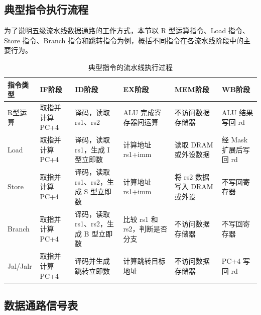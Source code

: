 \documentclass[UTF8,a4paper,12pt]{ctexart}
\begin{document}
\subsection{典型指令执行流程}

为了说明五级流水线数据通路的工作方式，本节以 R 型运算指令、Load 指令、Store 指令、Branch 指令和跳转指令为例，概括不同指令在各流水线阶段中的主要行为。

\begin{table}[H]
\centering
\caption{典型指令的流水线执行过程}
\footnotesize
\setlength{\tabcolsep}{3pt}
\renewcommand{\arraystretch}{1.2}
\begin{tabularx}{\textwidth}{p{2cm}p{2.2cm}p{2.4cm}p{2.4cm}p{2.4cm}X}
\toprule
指令类型 & IF阶段 & ID阶段 & EX阶段 & MEM阶段 & WB阶段 \\
\midrule
R型运算 & 取指并计算 PC+4 & 译码，读取 rs1、rs2 & ALU 完成寄存器间运算 & 不访问数据存储器 & ALU 结果写回 rd \\
Load & 取指并计算 PC+4 & 译码，读取 rs1，生成 I 型立即数 & 计算地址 rs1+imm & 读取 DRAM 或外设数据 & 经 Mask 扩展后写回 rd \\
Store & 取指并计算 PC+4 & 译码，读取 rs1、rs2，生成 S 型立即数 & 计算地址 rs1+imm & 将 rs2 数据写入 DRAM 或外设 & 不写回寄存器 \\
Branch & 取指并计算 PC+4 & 译码，读取 rs1、rs2，生成 B 型立即数 & 比较 rs1 和 rs2，判断是否分支 & 不访问数据存储器 & 不写回寄存器 \\
Jal/Jalr & 取指并计算 PC+4 & 译码并生成跳转立即数 & 计算跳转目标地址 & 不访问数据存储器 & PC+4 写回 rd \\
\bottomrule
\end{tabularx}
\end{table}

\subsection{数据通路信号表}
\end{document}
